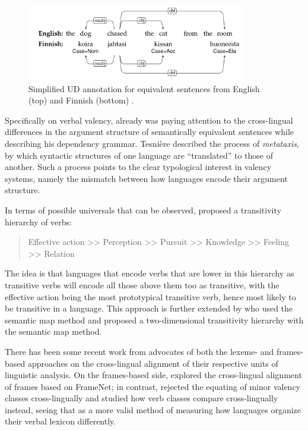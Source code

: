\begin{figure}
    \includegraphics[width=0.85\textwidth]{figures/ud_example_sentence.png}
    \centering
    \caption{Simplified UD annotation for equivalent sentences from English (top) and Finnish (bottom) \citep{demarneffe2021}.}\label{fig:ud-example-sentence}
\end{figure}

Specifically on verbal valency, already \citet{tesniere1959} was paying attention to the cross-lingual differences in the argument structure of semantically equivalent sentences while describing his dependency grammar. Tesnière described the process of \textit{metataxis}, by which syntactic structures of one language are ``translated'' to those of another. Such a process points to the clear typological interest in valency systems, namely the mismatch between how languages encode their argument structure.

In terms of possible universals that can be observed, \citet{tsunoda1981, tsunoda1985} proposed a transitivity hierarchy of verbs:
\begin{quote}
    Effective action >> Perception >> Pursuit >> Knowledge >> Feeling >> Relation
\end{quote}
The idea is that languages that encode verbs that are lower in this hierarchy as transitive verbs will encode all those above them too as transitive, with the effective action being the most prototypical transitive verb, hence most likely to be transitive in a language. This approach is further extended by \citet{malchukov2005} who used the semantic map method and proposed a two-dimensional transitivity hierarchy with the semantic map method. 

There has been some recent work from advocates of both the lexeme- and frames-based approaches on the cross-lingual alignment of their respective units of linguistic analysis. On the frames-based side, \citet{baker2020, ellsworth2021} explored the cross-lingual alignment of frames based on FrameNet; in contrast, \citet{say2014} rejected the equating of minor valency classes cross-lingually and studied how verb classes compare cross-lingually instead, seeing that as a more valid method of measuring how languages organize their verbal lexicon differently.

